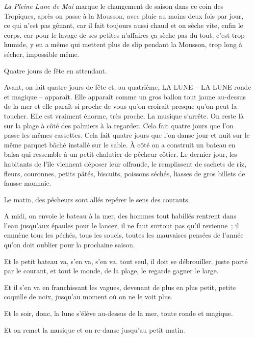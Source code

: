 \documentclass[twoside]{book} %
\begin{document}
\noindent \emph{La Pleine Lune de Mai} marque le changement de saison dans ce coin des Tropiques, après on passe à la Mousson, avec pluie au moins deux fois par jour, ce qui n’est pas gênant, car il fait toujours aussi chaud et on sèche vite, enfin le corps, car pour le lavage de ses petites n’affaires ça sèche pas du tout, c’est trop humide, y en a même qui mettent plus de slip pendant la Mousson, trop long à sécher, impossible même.\par
Quatre jours de fête en attendant.\par
Avant, on fait quatre jours de fête et, au quatrième, LA LUNE – LA LUNE ronde et magique – apparaît. Elle apparaît comme un gros ballon tout jaune au-dessus de la mer et elle paraît si proche de vous qu’on croirait presque qu’on peut la toucher. Elle est vraiment énorme, très proche. La musique s’arrête. On reste là sur la plage à côté des palmiers à la regarder. Cela fait quatre jours que l’on passe les mêmes cassettes. Cela fait quatre jours que l’on danse jour et nuit sur le même parquet bâché installé sur le sable. À côté on a construit un bateau en balsa qui ressemble à un petit chalutier de pêcheur côtier. Le dernier jour, les habitants de l’île viennent déposer leur offrande, le remplissent de sachets de riz, fleurs, couronnes, petits pâtés, biscuits, poissons séchés, liasses de gros billets de fausse monnaie.\par
Le matin, des pêcheurs sont allés repérer le sens des courants.\par
A midi, on envoie le bateau à la mer, des hommes tout habillés rentrent dans l’eau jusqu’aux épaules pour le lancer, il ne faut surtout pas qu’il revienne ; il emmène tous les péchés, tous les soucis, toutes les mauvaises pensées de l’année qu’on doit oublier pour la prochaine saison.\par
Et le petit bateau va, s’en va, s’en va, tout seul, il doit se débrouiller, juste porté par le courant, et tout le monde, de la plage, le regarde gagner le large.\par
Et il s’en va en franchissant les vagues, devenant de plus en plus petit, petite coquille de noix, jusqu’au moment où on ne le voit plus.\par
Et le soir, donc, la lune s’élève au-dessus de la mer, toute ronde et magique.\par
Et on remet la musique et on re-danse jusqu’au petit matin.\par
\bigbreak
\end{document}
